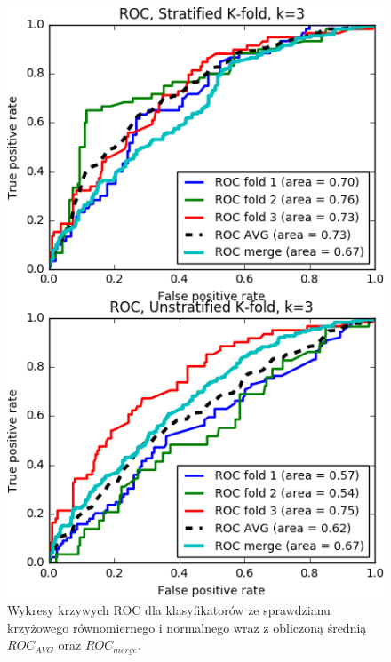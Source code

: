 \begin{figure}[H]
	\centering
	\includegraphics{./images/CV_ROC.png}
	\caption{Wykresy krzywych ROC dla klasyfikatorów ze sprawdzianu krzyżowego równomiernego i normalnego wraz z obliczoną średnią $ROC_{AVG}$ oraz $ROC_{merge}$.}
	\label{fig:cv_roc}
\end{figure}

